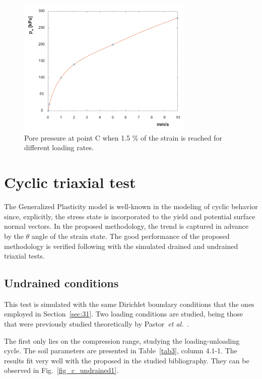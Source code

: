 \documentclass[preprint,12pt,a4paper]{elsarticle}
\begin{document}
\begin{figure}
\centering
\includegraphics[width=0.75\textwidth]{Figs/excess_porepressure.pdf}
\caption{Pore pressure at point C when 1.5 \% of the strain is reached for different loading rates.}
\label{fig_pw}
\end{figure}

\section{Cyclic triaxial test}
\label{sec:4}
The Generalized Plasticity model is well-known in the modeling of cyclic behavior since, explicitly, the stress state is incorporated to the yield and potential surface normal vectors. In the proposed methodology, the trend is captured in advance by the $\theta$ angle of the strain state. The good performance of the proposed methodology is verified following with the simulated drained and undrained triaxial tests.

\subsection{Undrained conditions}
\label{subsec:41}
This test is simulated with the same Dirichlet boundary conditions that the ones employed in Section~\ref{sec:31}. Two loading conditions are studied, being those that were previously studied theoretically by Pastor~\textit{et al.}~\cite{PastorZC:90}. 

The first only lies on the compression range, studying the loading-unloading cycle. The soil parameters are presented in Table~\ref{tab3}, column 4.1-1. The results fit very well with the proposed in the studied bibliography. They can be observed in Fig.~\ref{fig_c_undrained1}.
\end{document}
